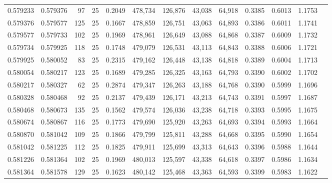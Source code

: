 \begin{tabular}{rrrrrrrrrrrrr}
0.579233 & 0.579376 &    97 &  25 &                                     0.2049 & 478,734 & 126,876 &  43,038 &  64,918 & 0.3385 & 0.6013 & 1.1753 \\
0.579376 & 0.579577 &   125 &  25 &                                     0.1667 & 478,859 & 126,751 &  43,063 &  64,893 & 0.3386 & 0.6011 & 1.1741 \\
0.579577 & 0.579733 &   102 &  25 &                                     0.1969 & 478,961 & 126,649 &  43,088 &  64,868 & 0.3387 & 0.6009 & 1.1732 \\
0.579734 & 0.579925 &   118 &  25 &                                     0.1748 & 479,079 & 126,531 &  43,113 &  64,843 & 0.3388 & 0.6006 & 1.1721 \\
0.579925 & 0.580052 &    83 &  25 &                                     0.2315 & 479,162 & 126,448 &  43,138 &  64,818 & 0.3389 & 0.6004 & 1.1713 \\
0.580054 & 0.580217 &   123 &  25 &                                     0.1689 & 479,285 & 126,325 &  43,163 &  64,793 & 0.3390 & 0.6002 & 1.1702 \\
0.580217 & 0.580327 &    62 &  25 &                                     0.2874 & 479,347 & 126,263 &  43,188 &  64,768 & 0.3390 & 0.5999 & 1.1696 \\
0.580328 & 0.580468 &    92 &  25 &                                     0.2137 & 479,439 & 126,171 &  43,213 &  64,743 & 0.3391 & 0.5997 & 1.1687 \\
0.580468 & 0.580673 &   135 &  25 &                                     0.1562 & 479,574 & 126,036 &  43,238 &  64,718 & 0.3393 & 0.5995 & 1.1675 \\
0.580674 & 0.580867 &   116 &  25 &                                     0.1773 & 479,690 & 125,920 &  43,263 &  64,693 & 0.3394 & 0.5993 & 1.1664 \\
0.580870 & 0.581042 &   109 &  25 &                                     0.1866 & 479,799 & 125,811 &  43,288 &  64,668 & 0.3395 & 0.5990 & 1.1654 \\
0.581042 & 0.581225 &   112 &  25 &                                     0.1825 & 479,911 & 125,699 &  43,313 &  64,643 & 0.3396 & 0.5988 & 1.1644 \\
0.581226 & 0.581364 &   102 &  25 &                                     0.1969 & 480,013 & 125,597 &  43,338 &  64,618 & 0.3397 & 0.5986 & 1.1634 \\
0.581364 & 0.581578 &   129 &  25 &                                     0.1623 & 480,142 & 125,468 &  43,363 &  64,593 & 0.3399 & 0.5983 & 1.1622 \\

\end{tabular}
